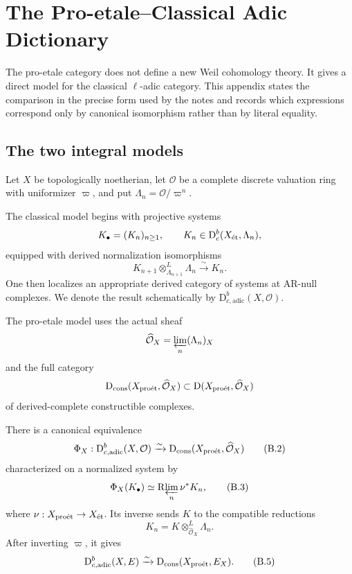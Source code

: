 \chapter{The Pro-etale--Classical Adic Dictionary}
\label{app:proetale-classical-dictionary}

The pro-etale category does not define a new Weil cohomology theory.  It gives
a direct model for the classical \(\ell\)-adic category.  This appendix states
the comparison in the precise form used by the notes and records which
expressions correspond only by canonical isomorphism rather than by literal
equality.

\section{The two integral models}

Let \(X\) be topologically noetherian, let
\(\mathcal O\) be a complete discrete valuation ring with uniformizer
\(\varpi\), and put \(\Lambda_n=\mathcal O/\varpi^n\).

The classical model begins with projective systems
\[
  K_\bullet=(K_n)_{n\geq1},
  \qquad
  K_n\in\mathrm D^b_c(X_{\mathrm{\acute et}},\Lambda_n),
\]
equipped with derived normalization isomorphisms
\[
  K_{n+1}\otimes^L_{\Lambda_{n+1}}\Lambda_n
     \xrightarrow{\sim}K_n.
\tag{B.1}\label{eq:dictionary-normalized-system}
\]
One then localizes an appropriate derived category of systems at AR-null
complexes.  We denote the result schematically by
\(\mathrm D^b_{c,\mathrm{adic}}(X,\mathcal O)\).

The pro-etale model uses the actual sheaf
\[
  \widehat{\mathcal O}_X
     =\varprojlim_n(\Lambda_n)_X
\]
and the full category
\[
  \mathrm D_{\mathrm{cons}}(X_{\mathrm{pro\acute et}},\widehat{\mathcal O}_X)
  \subset
  \mathrm D(X_{\mathrm{pro\acute et}},\widehat{\mathcal O}_X)
\]
of derived-complete constructible complexes.

\begin{theorem}
\label{thm:dictionary-integral-comparison}
There is a canonical equivalence
\[
 \Phi_X:
 \mathrm D^b_{c,\mathrm{adic}}(X,\mathcal O)
 \xrightarrow{\sim}
 \mathrm D_{\mathrm{cons}}(X_{\mathrm{pro\acute et}},\widehat{\mathcal O}_X)
\tag{B.2}\label{eq:dictionary-integral-equivalence}
\]
characterized on a normalized system by
\[
 \Phi_X(K_\bullet)
   \simeq
 \mathrm R\!\varprojlim_n\nu^*K_n,
\tag{B.3}\label{eq:dictionary-realization}
\]
where \(\nu:X_{\mathrm{pro\acute et}}\to X_{\mathrm{\acute et}}\).  Its inverse sends \(K\) to the
compatible reductions
\[
 K_n=K\otimes^L_{\widehat{\mathcal O}_X}\Lambda_n.
\tag{B.4}\label{eq:dictionary-reductions}
\]
After inverting \(\varpi\), it gives
\[
 \mathrm D^b_{c,\mathrm{adic}}(X,E)
 \xrightarrow{\sim}
 \mathrm D_{\mathrm{cons}}(X_{\mathrm{pro\acute et}},E_X).
\tag{B.5}\label{eq:dictionary-rational-equivalence}
\]
\end{theorem}

